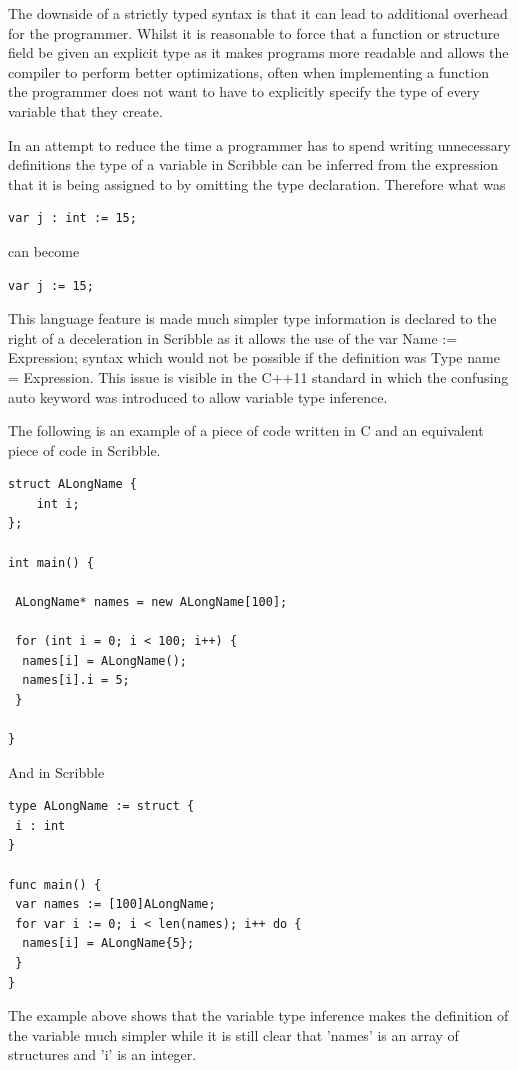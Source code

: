 \documentclass[]{final_report}
\begin{document}
The downside of a strictly typed syntax is that it can lead to additional overhead for the programmer. Whilst it is reasonable to force that a function or structure field be given an explicit type as it makes programs more readable and allows the compiler to perform better optimizations, often when implementing a function the programmer does not want to have to explicitly specify the type of every variable that they create.

In an attempt to reduce the time a programmer has to spend writing unnecessary definitions the type of a variable in Scribble can be inferred from the expression that it is being assigned to by omitting the type declaration. Therefore what was 

\begin{verbatim}
var j : int := 15;
\end{verbatim}
can become \begin{verbatim}
var j := 15;
\end{verbatim}

This language feature is made much simpler type information is declared to the right of a deceleration in Scribble as it allows the use of the var Name := Expression; syntax which would not be possible if the definition was Type name = Expression. This issue is visible in the C++11 standard in which the confusing auto keyword was introduced to allow variable type inference.

The following is an example of a piece of code written in C and an equivalent piece of code in Scribble.

\begin{verbatim}
struct ALongName {
	int i;
};

int main() {

 ALongName* names = new ALongName[100];
 
 for (int i = 0; i < 100; i++) {
  names[i] = ALongName();
  names[i].i = 5;
 }

}
\end{verbatim}
And in Scribble
\begin{verbatim}
type ALongName := struct {
 i : int
}

func main() {
 var names := [100]ALongName;
 for var i := 0; i < len(names); i++ do {
  names[i] = ALongName{5};
 }
}
\end{verbatim}

The example above shows that the variable type inference makes the definition of the variable much simpler while it is still clear that 'names' is an array of structures and 'i' is an integer.
\end{document}
